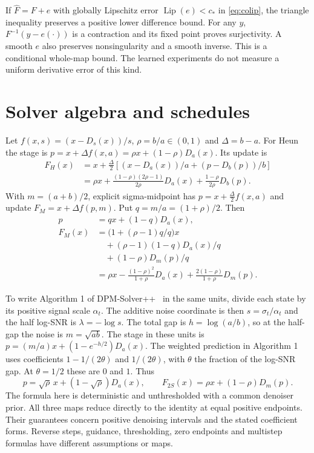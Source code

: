\documentclass[10pt,twocolumn,letterpaper]{article}
\begin{document}
If $\widehat F=F+e$ with globally Lipschitz error $\operatorname{Lip}(e)<c_*$ in \cref{eq:colip}, the triangle inequality preserves a positive lower difference bound. For any $y$, $F^{-1}(y-e(\cdot))$ is a contraction and its fixed point proves surjectivity. A smooth $e$ also preserves nonsingularity and a smooth inverse. This is a conditional whole-map bound. The learned experiments do not measure a uniform derivative error of this kind.

\section{Solver algebra and schedules}
\label{sec:algebra}
Let $f(x,s)=(x-D_s(x))/s$, $\rho=b/a\in(0,1)$ and $\Delta=b-a$. For Heun the stage is $p=x+\Delta f(x,a)=\rho x+(1-\rho)D_a(x)$. Its update is
\[
 \begin{aligned}
 F_H(x)&=x+\tfrac{\Delta}{2}\left[(x-D_a(x))/a+(p-D_b(p))/b\right]\\
 &=\rho x+\frac{(1-\rho)(2\rho-1)}{2\rho}D_a(x)+\frac{1-\rho}{2\rho}D_b(p).
 \end{aligned}
\]
With $m=(a+b)/2$, explicit sigma-midpoint has $p=x+\tfrac{\Delta}{2}f(x,a)$ and update $F_M=x+\Delta f(p,m)$. Put $q=m/a=(1+\rho)/2$. Then
\[
 \begin{aligned}
 p&=qx+(1-q)D_a(x),\\
 F_M(x)&=\bigl(1+(\rho-1)q/q\bigr)x\\
 &\quad+(\rho-1)(1-q)D_a(x)/q\\
 &\quad+(1-\rho)D_m(p)/q\\
 &=\rho x-\frac{(1-\rho)^2}{1+\rho}D_a(x)+\frac{2(1-\rho)}{1+\rho}D_m(p).
 \end{aligned}
\]

To write Algorithm 1 of DPM-Solver++~\cite{lu2022} in the same units, divide each state by its positive signal scale $\alpha_t$. The additive noise coordinate is then $s=\sigma_t/\alpha_t$ and the half log-SNR is $\lambda=-\log s$. The total gap is $h=\log(a/b)$, so at the half-gap the noise is $m=\sqrt{ab}$. The stage in these units is $p=(m/a)x+(1-e^{-h/2})D_a(x)$. The weighted prediction in Algorithm 1 uses coefficients $1-1/(2\theta)$ and $1/(2\theta)$, with $\theta$ the fraction of the log-SNR gap. At $\theta=1/2$ these are $0$ and $1$. Thus
\[
 p=\sqrt{\rho}\,x+(1-\sqrt{\rho})D_a(x),\qquad F_{2S}(x)=\rho x+(1-\rho)D_m(p).
\]
The formula here is deterministic and unthresholded with a common denoiser prior. All three maps reduce directly to the identity at equal positive endpoints. Their guarantees concern positive denoising intervals and the stated coefficient forms. Reverse steps, guidance, thresholding, zero endpoints and multistep formulas have different assumptions or maps.
\end{document}
